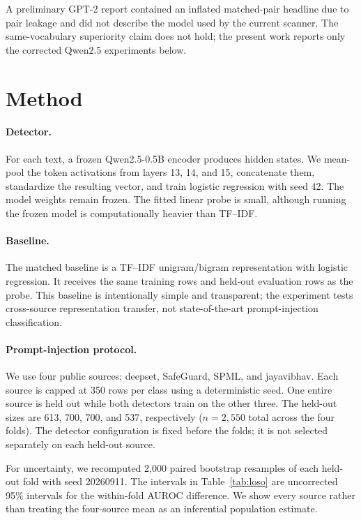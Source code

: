 \documentclass[10pt]{article}
\begin{document}
A preliminary GPT-2 report \citep{leung2026preliminary} contained an inflated matched-pair headline due to pair leakage and did not describe the model used by the current scanner. The same-vocabulary superiority claim does not hold; the present work reports only the corrected Qwen2.5 experiments below.

\section{Method}

\paragraph{Detector.}
For each text, a frozen Qwen2.5-0.5B encoder produces hidden states. We mean-pool the token activations from layers 13, 14, and 15, concatenate them, standardize the resulting vector, and train logistic regression with seed 42. The model weights remain frozen. The fitted linear probe is small, although running the frozen model is computationally heavier than TF--IDF.

\paragraph{Baseline.}
The matched baseline is a TF--IDF unigram/bigram representation with logistic regression. It receives the same training rows and held-out evaluation rows as the probe. This baseline is intentionally simple and transparent; the experiment tests cross-source representation transfer, not state-of-the-art prompt-injection classification.

\paragraph{Prompt-injection protocol.}
We use four public sources: deepset, SafeGuard, SPML, and jayavibhav. Each source is capped at 350 rows per class using a deterministic seed. One entire source is held out while both detectors train on the other three. The held-out sizes are 613, 700, 700, and 537, respectively ($n=2{,}550$ total across the four folds). The detector configuration is fixed before the folds; it is not selected separately on each held-out source.

For uncertainty, we recomputed 2,000 paired bootstrap resamples of each held-out fold with seed 20260911. The intervals in Table~\ref{tab:loso} are uncorrected 95\% intervals for the within-fold AUROC difference. We show every source rather than treating the four-source mean as an inferential population estimate.
\end{document}

